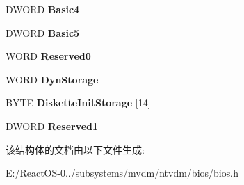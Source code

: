 \begin{DoxyCompactItemize}
D\+W\+O\+RD {\bfseries Basic4}
\item 
\mbox{\label{struct_u_s_e_r___d_a_t_a___a_r_e_a_ac6e0a65e83abdf0db79aa2eb6a586536}} 
D\+W\+O\+RD {\bfseries Basic5}
\item 
\mbox{\label{struct_u_s_e_r___d_a_t_a___a_r_e_a_ad9067396f4af46cf5c676fba53e25075}} 
W\+O\+RD {\bfseries Reserved0}
\item 
\mbox{\label{struct_u_s_e_r___d_a_t_a___a_r_e_a_a0331d2e35aff4968cce33ee2092f839a}} 
W\+O\+RD {\bfseries Dyn\+Storage}
\item 
\mbox{\label{struct_u_s_e_r___d_a_t_a___a_r_e_a_ae970ae5e31b2928d865f2bd495e843b7}} 
B\+Y\+TE {\bfseries Diskette\+Init\+Storage} \mbox{[}14\mbox{]}
\item 
\mbox{\label{struct_u_s_e_r___d_a_t_a___a_r_e_a_aa0c5247c2a736a66685b5ed704b05b68}} 
D\+W\+O\+RD {\bfseries Reserved1}
\end{DoxyCompactItemize}


该结构体的文档由以下文件生成\+:\begin{DoxyCompactItemize}
\item 
E\+:/\+React\+O\+S-\/0../subsystems/mvdm/ntvdm/bios/bios.\+h\end{DoxyCompactItemize}
